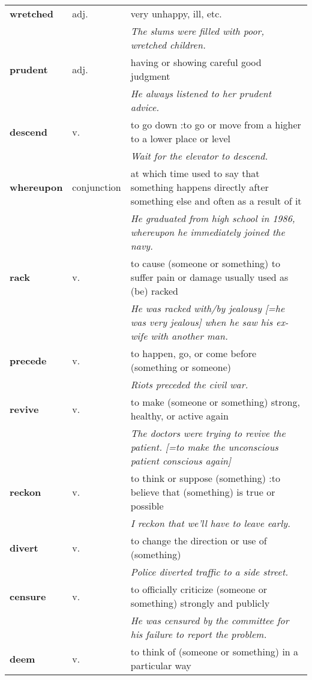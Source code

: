 \documentclass[a4paper]{article}
\begin{document}
\begin{longtable}{llp{11cm}}
\textbf{wretched} & adj. &  very unhappy, ill, etc. \\
 & & \textit{The slums were filled with poor, wretched children.}\\[0.08cm]
\textbf{prudent} & adj. &  having or showing careful good judgment \\
 & & \textit{He always listened to her prudent advice.}\\[0.08cm]
\textbf{descend} & v. &  to go down :to go or move from a higher to a lower place or level \\
 & & \textit{Wait for the elevator to descend.}\\[0.08cm]
\textbf{whereupon} & conjunction &  at which time used to say that something happens directly after something else and often as a result of it \\
 & & \textit{He graduated from high school in 1986, whereupon he immediately joined the navy.}\\[0.08cm]
\textbf{rack} & v. &  to cause (someone or something) to suffer pain or damage usually used as (be) racked \\
 & & \textit{He was racked with/by jealousy [=he was very jealous] when he saw his ex-wife with another man.}\\[0.08cm]
\textbf{precede} & v. &  to happen, go, or come before (something or someone) \\
 & & \textit{Riots preceded the civil war.}\\[0.08cm]
\textbf{revive} & v. &  to make (someone or something) strong, healthy, or active again \\
 & & \textit{The doctors were trying to revive the patient. [=to make the unconscious patient conscious again]}\\[0.08cm]
\textbf{reckon} & v. &  to think or suppose (something) :to believe that (something) is true or possible \\
 & & \textit{I reckon that we'll have to leave early.}\\[0.08cm]
\textbf{divert} & v. &  to change the direction or use of (something) \\
 & & \textit{Police diverted traffic to a side street.}\\[0.08cm]
\textbf{censure} & v. &  to officially criticize (someone or something) strongly and publicly \\
 & & \textit{He was censured by the committee for his failure to report the problem.}\\[0.08cm]
\textbf{deem} & v. &  to think of (someone or something) in a particular way \\

\end{longtable}
\end{document}
